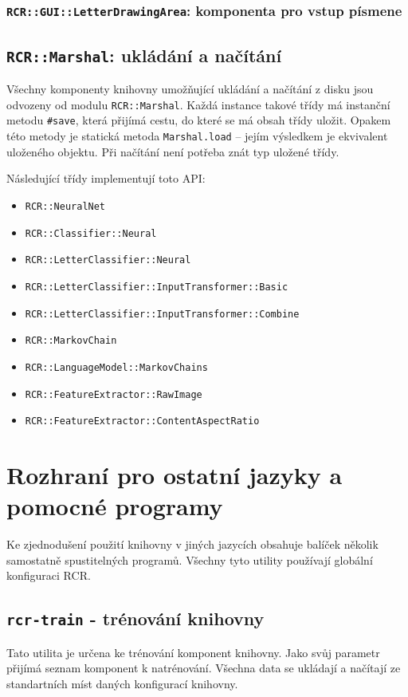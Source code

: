\documentclass[a4paper]{article}
\begin{document}
\subsubsection{\texttt{RCR::GUI::LetterDrawingArea}: komponenta pro vstup
písmene}

\subsection{\texttt{RCR::Marshal}: ukládání a načítání}
Všechny komponenty knihovny umožňující ukládání a načítání z disku jsou odvozeny
od modulu \texttt{RCR::Marshal}. Každá instance takové třídy má instanční metodu
\texttt{\#save}, která přijímá cestu, do které se má obsah třídy uložit. Opakem
této metody je statická metoda \texttt{Marshal.load} -- jejím výsledkem je
ekvivalent uloženého objektu. Při načítání není potřeba znát typ uložené třídy.

Následující třídy implementují toto API:
\begin{itemize}
\item \texttt{RCR::NeuralNet}
\item \texttt{RCR::Classifier::Neural}
\item \texttt{RCR::LetterClassifier::Neural}
\item \texttt{RCR::LetterClassifier::InputTransformer::Basic}
\item \texttt{RCR::LetterClassifier::InputTransformer::Combine}
\item \texttt{RCR::MarkovChain}
\item \texttt{RCR::LanguageModel::MarkovChains}
\item \texttt{RCR::FeatureExtractor::RawImage}
\item \texttt{RCR::FeatureExtractor::ContentAspectRatio}
\end{itemize}

\section{Rozhraní pro ostatní jazyky a pomocné programy}
Ke zjednodušení použití knihovny v jiných jazycích obsahuje balíček několik
samostatně spustitelných programů. Všechny tyto utility používají globální
konfiguraci RCR.

\subsection{\texttt{rcr-train} - trénování knihovny}
Tato utilita je určena ke trénování komponent knihovny.
Jako svůj parametr přijímá seznam komponent k natrénování.
Všechna data se ukládají a načítají ze standartních míst daných konfigurací
knihovny.
\end{document}
